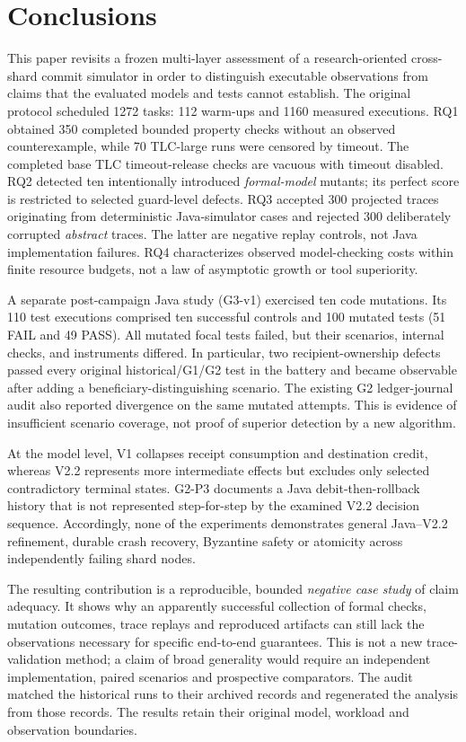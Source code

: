 \section{Conclusions}
\label{sec:conclusions}

This paper revisits a frozen multi-layer assessment of a research-oriented
cross-shard commit simulator in order to distinguish executable observations
from claims that the evaluated models and tests cannot establish. The
original protocol scheduled 1272 tasks: 112 warm-ups and 1160 measured
executions. RQ1 obtained 350 completed bounded property checks without an
observed counterexample, while 70 TLC-large runs were censored by timeout.
The completed base TLC timeout-release checks are vacuous with timeout
disabled.
RQ2 detected ten intentionally introduced \emph{formal-model} mutants; its
perfect score is restricted to selected guard-level defects. RQ3 accepted
300 projected traces originating from deterministic Java-simulator cases
and rejected 300 deliberately corrupted \emph{abstract} traces. The latter
are negative replay controls, not Java implementation failures. RQ4
characterizes observed model-checking costs within finite resource budgets,
not a law of asymptotic growth or tool superiority.

A separate post-campaign Java study (G3-v1) exercised ten code mutations.
Its 110 test executions comprised ten successful controls and 100 mutated
tests (51 FAIL and 49 PASS). All mutated focal tests failed, but their
scenarios, internal checks, and instruments differed. In particular, two
recipient-ownership defects passed every original historical/G1/G2 test in
the battery and became observable after adding a beneficiary-distinguishing
scenario. The existing G2 ledger-journal audit also reported divergence on the same
mutated attempts. This is evidence of insufficient scenario coverage, not proof of
superior detection by a new algorithm.

At the model level, V1 collapses receipt consumption and destination credit,
whereas V2.2 represents more intermediate effects but excludes only selected
contradictory terminal states. G2-P3 documents a Java debit-then-rollback
history that is not represented step-for-step by the examined V2.2 decision
sequence. Accordingly, none of the experiments demonstrates general
Java--V2.2 refinement, durable crash recovery, Byzantine safety or
atomicity across independently failing shard nodes.

The resulting contribution is a reproducible, bounded \emph{negative case
study} of claim adequacy. It shows why an apparently successful collection of
formal checks, mutation outcomes, trace replays and reproduced artifacts can
still lack the observations necessary for specific end-to-end guarantees.
This is not a new trace-validation method; a claim of broad generality would
require an independent implementation, paired scenarios and prospective
comparators. The audit matched the historical runs to their archived records
and regenerated the analysis from those records. The results retain their
original model, workload and observation boundaries.
